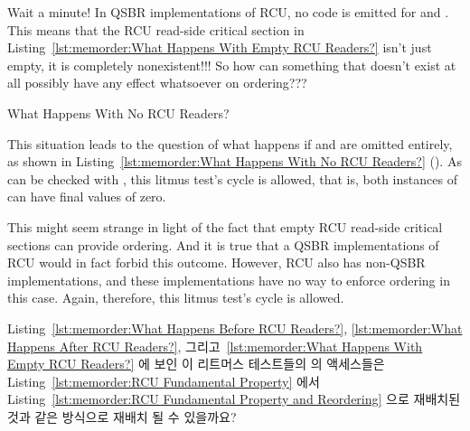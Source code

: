 \QuickQuiz{}
	Wait a minute!
	In QSBR implementations of RCU, no code is emitted for
	 and .
	This means that the RCU read-side critical section in
	Listing~\ref{lst:memorder:What Happens With Empty RCU Readers?}
	isn't just empty, it is completely nonexistent!!!
	So how can something that doesn't exist at all possibly have
	any effect whatsoever on ordering???
 \QuickQuizEnd

\begin{listing}[tb]

\caption{What Happens With No RCU Readers?}
\label{lst:memorder:What Happens With No RCU Readers?}
\end{listing}

This situation leads to the question of what happens if
 and  are omitted
entirely, as shown in
Listing~\ref{lst:memorder:What Happens With No RCU Readers?}
().
As can be checked with , this litmus test's cycle is allowed,
that is, both instances of  can have final values of zero.

This might seem strange in light of the fact that empty RCU
read-side critical sections can provide ordering.
And it is true that a QSBR implementations of RCU would in fact
forbid this outcome.
However, RCU also has non-QSBR implementations, and these implementations
have no way to enforce ordering in this case.
Again, therefore, this litmus test's cycle is allowed.

\QuickQuiz{}
	Listing~\ref{lst:memorder:What Happens Before RCU Readers?},
	\ref{lst:memorder:What Happens After RCU Readers?},
	그리고~\ref{lst:memorder:What Happens With Empty RCU Readers?}
	에 보인 이 리트머스 테스트들의  의 액세스들은
	Listing~\ref{lst:memorder:RCU Fundamental Property}
	에서
	Listing~\ref{lst:memorder:RCU Fundamental Property and Reordering}
	으로 재배치된 것과 같은 방식으로 재배치 될 수 있을까요?
	\iffalse

